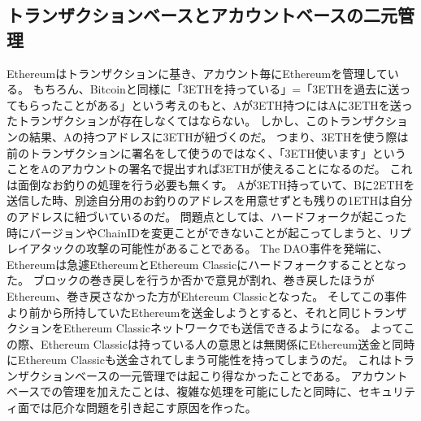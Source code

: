 \subsection{トランザクションベースとアカウントベースの二元管理}
Ethereumはトランザクションに基き、アカウント毎にEthereumを管理している。
もちろん、Bitcoinと同様に「3ETHを持っている」=「3ETHを過去に送ってもらったことがある」という考えのもと、Aが3ETH持つにはAに3ETHを送ったトランザクションが存在しなくてはならない。
しかし、このトランザクションの結果、Aの持つアドレスに3ETHが紐づくのだ。
つまり、3ETHを使う際は前のトランザクションに署名をして使うのではなく、「3ETH使います」ということをAのアカウントの署名で提出すれば3ETHが使えることになるのだ。
これは面倒なお釣りの処理を行う必要も無くす。
Aが3ETH持っていて、Bに2ETHを送信した時、別途自分用のお釣りのアドレスを用意せずとも残りの1ETHは自分のアドレスに紐づいているのだ。
問題点としては、ハードフォークが起こった時にバージョンやChainIDを変更ことができないことが起こってしまうと、リプレイアタックの攻撃の可能性があることである。
The DAO事件を発端に、Ethereumは急遽EthereumとEthereum Classicにハードフォークすることとなった。
ブロックの巻き戻しを行うか否かで意見が割れ、巻き戻したほうがEthereum、巻き戻さなかった方がEhtereum Classicとなった。
そしてこの事件より前から所持していたEthereumを送金しようとすると、それと同じトランザクションをEthereum Classicネットワークでも送信できるようになる。
よってこの際、Ethereum Classicは持っている人の意思とは無関係にEthereum送金と同時にEthereum Classicも送金されてしまう可能性を持ってしまうのだ。
これはトランザクションベースの一元管理では起こり得なかったことである。
アカウントベースでの管理を加えたことは、複雑な処理を可能にしたと同時に、セキュリティ面では厄介な問題を引き起こす原因を作った。

